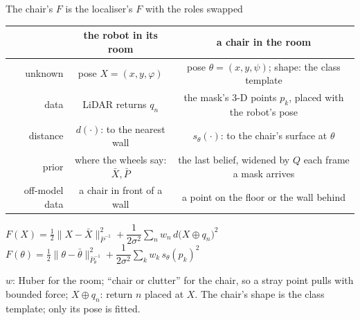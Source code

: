 \documentclass[10pt, aspectratio=169]{beamer}
\begin{document}
\begin{frame}{The chair's $F$ is the localiser's $F$ with the roles swapped}
  \centering
  \vspace{0pt plus 1filll}
  \renewcommand{\arraystretch}{1.35}
  {\small
  \begin{tabular}{@{}r|c|c@{}}
    & \textbf{the robot in its room} & \textbf{a chair in the room} \\ \hline
    unknown & pose $X = (x, y, \varphi)$ & pose $\theta = (x, y, \psi)$; shape: the class template \\
    data & LiDAR returns $q_n$ & the mask's 3-D points $p_k$, placed with the robot's pose \\
    distance & $d(\cdot)$: to the nearest wall & $s_\theta(\cdot)$: to the chair's surface at $\theta$ \\
    prior & where the wheels say: $\bar X, \bar P$ & the last belief, widened by $Q$ each frame a mask arrives \\
    off-model data & a chair in front of a wall & a point on the floor or the wall behind \\
  \end{tabular}}

  \vspace{0.9em}
  {\normalsize
  $F(X) = \tfrac12\lVert X - \bar X\rVert^2_{\bar P^{-1}} + \dfrac{1}{2\sigma^2}\displaystyle\sum_n w_n\, d\big(X \oplus q_n\big)^2$
  \qquad
  $F(\theta) = \tfrac12\lVert \theta - \bar\theta\rVert^2_{\bar P_\theta^{-1}} + \dfrac{1}{2\sigma^2}\displaystyle\sum_k w_k\, s_\theta(p_k)^2$\par}
  \vspace{0.6em}
  {\footnotesize $w$: Huber for the room; ``chair or clutter'' for the chair, so a stray point pulls with bounded force;\; $X \oplus q_n$: return $n$ placed at $X$.\;
   The chair's shape is the class template; only its pose is fitted.\par}
  \vspace{0pt plus 1filll}
\end{frame}
\end{document}
